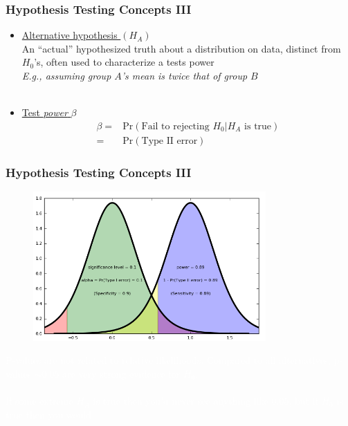 \documentclass[xcolor={dvipsnames}]{beamer}
\begin{document}
\frame
{
 \frametitle{Hypothesis Testing Concepts III}

\begin{itemize}
\item \underline{Alternative hypothesis $(H_A)$}\\
An ``actual'' hypothesized truth about a distribution on data, distinct from $H_0$'s, 
often used to characterize a tests power\\
\emph{E.g., assuming group $A$'s mean is twice that of group $B$}\\${}$\\

\item \underline{Test \emph{power} $\beta$}
\begin{align*}
\beta =& \text{Pr}(\text{Fail to rejecting $H_0$} | H_A \text{ is true})\\
=& \text{Pr}(\text{Type II error})
\end{align*}
\end{itemize}
}




\frame
{
 \frametitle{Hypothesis Testing Concepts III}
 
 \begin{figure}
\centering
\includegraphics[width=3.5in]{stuff/tests_3.png}
\end{figure}

\textcolor{white}{
P-values are not related to relative likelihoods.
Compared to all alternatives, p-values  $\sim 0.05$
  are very strong evidence for  $H_0$.\\${}$\\ 
If some extreme  $H_A$
  is true then you'd never see anything like  $0.05$, but if  $H_0$
  is true then you would...}

}
\end{document}
